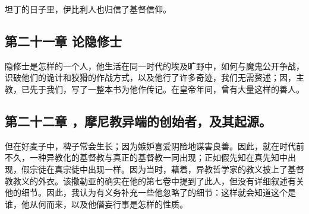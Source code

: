 坦丁的日子里，伊比利人也归信了基督信仰。\par


\subsection{第二十一章 论隐修士}

隐修士是怎样的一个人，他生活在同一时代的埃及旷野中，如何与魔鬼公开争战，识破他们的诡计和狡猾的作战方式，以及他行了许多奇迹，我们无需赘述；因，主教，已先于我们，写了一整本书为他作传记。在皇帝年间，曾有大量这样的善人。\par


\subsection{第二十二章  ，摩尼教异端的创始者，及其起源。}

但在好麦子中，稗子常会生长；因为嫉妒喜爱阴险地谋害良善。因此，就在时代前不久，一种异教化的基督教与真正的基督教一同出现；正如假先知在真先知中出现，假宗徒在真宗徒中出现一样。因为当时，藉着，异教哲学家的教义披上了基督教教义的外衣。该撒勒亚的确实在他的第七卷中提到了此人，但没有详细叙述有关他的细节。因此，我认为有义务补充一些他忽略了的细节：这样就会知道这个是谁，他从何而来，以及他僭妄行事是怎样的性质。\par

